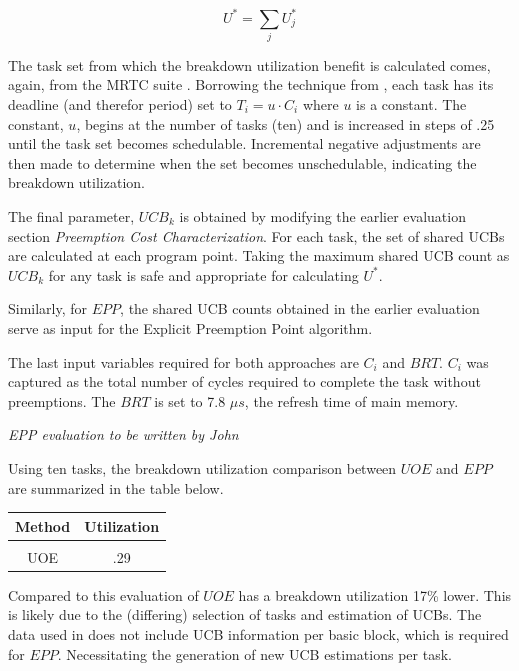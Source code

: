 \begin{equation}
  U^* = \sum_j U^*_j
\end{equation}

The task set from which the breakdown utilization benefit is
calculated comes, again, from the MRTC suite \cite{mrtc:01}. Borrowing
the technique from \cite{lunniss:13}, each task has its deadline (and
therefor period) set to ${T_i = u \cdot C_i}$
where ${u}$ is a constant. The constant, ${u}$, begins at the number
of tasks (ten) and is increased in steps of .25 until the task set
becomes schedulable. Incremental negative adjustments are then made to
determine when the set becomes unschedulable, indicating the breakdown
utilization.

The final parameter, ${UCB_k}$ is obtained by modifying the earlier
evaluation section \emph{Preemption Cost Characterization}. For each
task, the set of shared UCBs are calculated at each program
point. Taking the maximum shared UCB count as ${UCB_k}$ for any task
is safe and appropriate for calculating ${U^*}$.

Similarly, for ${EPP}$, the shared UCB counts obtained in the earlier
evaluation serve as input for the Explicit Preemption Point
algorithm. 

The last input variables required for both approaches are ${C_i}$ and
${BRT}$. ${C_i}$ was captured as the total number of cycles required
to complete the task without preemptions. The ${BRT}$ is set to 7.8
${{\mu}s}$, the refresh time of main memory.

\emph{EPP evaluation to be written by John}

Using ten tasks, the breakdown utilization comparison between ${UOE}$
and ${EPP}$ are summarized in the table below.


\begin{minipage}{\linewidth}
  \bigskip
  \centering
    \begin{tabular}{c | c}
      Method & Utilization \\
      \hline
      \\
      UOE & .29 \\
    \end{tabular}
\end{minipage}

Compared to \cite{lunniss:13} this evaluation of ${UOE}$ has a
breakdown utilization 17\% lower. This is likely due to the
(differing) selection of tasks and estimation of UCBs. The data used
in \cite{lunniss:13} does not include UCB information per basic block,
which is required for ${EPP}$. Necessitating the generation of new
UCB estimations per task.


